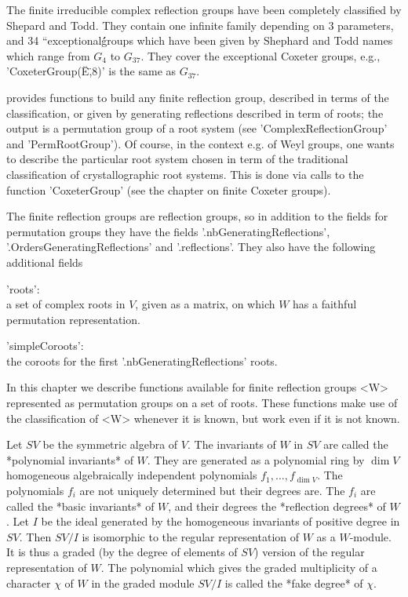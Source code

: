 The  finite  irreducible  complex  reflection  groups  have been completely
classified  by Shepard and Todd. They contain one infinite family depending
on  3 parameters, and 34 ``exceptional\'\'  groups which have been given by
Shephard  and Todd names which range from $G_4$ to $G_{37}$. They cover the
exceptional  Coxeter groups,  e.g., 'CoxeterGroup(\"E\",8)'  is the same as
$G_{37}$.

{\CHEVIE}   provides  functions  to  build  any  finite  reflection  group,
described   in  terms  of  the   classification,  or  given  by  generating
reflections  described in term of roots;  the output is a permutation group
of  a root  system (see  'ComplexReflectionGroup' and  'PermRootGroup'). Of
course,  in the  context e.g.  of Weyl  groups, one  wants to  describe the
particular  root system chosen in term of the traditional classification of
crystallographic  root  systems.  This  is  done  via calls to the function
'CoxeterGroup'  (see the chapter on finite  Coxeter groups).

The   finite   reflection   groups   are  reflection   groups,   so   in
addition  to   the  fields   for  permutation   groups  they   have  the
fields  '.nbGeneratingReflections',  '.OrdersGeneratingReflections'  and
'.reflections'. They also have the following additional fields\:

'roots':\\ a set of complex roots in $V$, given as a matrix, on which $W$
       has a faithful permutation representation.

'simpleCoroots':\\ the  coroots for the  first '.nbGeneratingReflections'
       roots.

In  this  chapter  we  describe  functions  available for finite reflection
groups  <W>  represented  as  permutation  groups  on a set of roots. These
functions  make use of the classification of  <W> whenever it is known, but
work even if it is not known.

Let $SV$ be the symmetric algebra of $V$. The invariants of $W$ in $SV$ are
called  the  *polynomial  invariants*  of  $W$.  They  are  generated  as a
polynomial   ring  by   $\dim  V$   homogeneous  algebraically  independent
polynomials $f_1,\ldots,f_{\dim V}$. The polynomials $f_i$ are not uniquely
determined  but  their  degrees  are.  The  $f_i$  are  called  the  *basic
invariants*  of $W$, and their degrees the *reflection degrees* of $W$. Let
$I$ be the ideal generated by the homogeneous invariants of positive degree
in  $SV$. Then $SV/I$ is isomorphic to the regular representation of $W$ as
a  $W$-module. It  is thus  a graded  (by the  degree of  elements of $SV$)
version  of the regular  representation of $W$.  The polynomial which gives
the  graded multiplicity of a character $\chi$  of $W$ in the graded module
$SV/I$ is called the *fake degree* of $\chi$.


